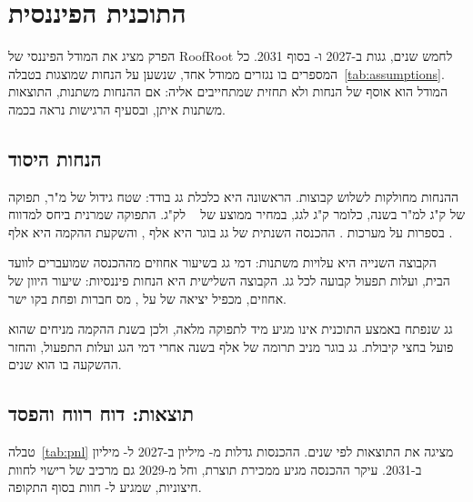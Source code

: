 \chapter{התוכנית הפיננסית}\label{ch:financials}

הפרק מציג את המודל הפיננסי של RoofRoot לחמש שנים, \RRroofsFirst{} גגות ב-2027 ו-\RRroofsFinal{} בסוף 2031. כל המספרים בו נגזרים ממודל אחד, שנשען על הנחות שמוצגות בטבלה~\ref{tab:assumptions}. המודל הוא אוסף של הנחות ולא תחזית שמתחייבים אליה: אם ההנחות משתנות, התוצאות משתנות איתן, ובסעיף הרגישות נראה בכמה.

\section{הנחות היסוד}

ההנחות מחולקות לשלוש קבוצות. הראשונה היא כלכלת גג בודד: שטח גידול של \RRarea{} מ"ר, תפוקה של \RRyield{} ק"ג למ"ר בשנה, כלומר \RRroofKg{} ק"ג לגג, במחיר ממוצע של \RRprice~\shekel{} לק"ג. התפוקה שמרנית ביחס למדווח בספרות על מערכות  \cite{barbosa2015}. ההכנסה השנתית של גג בוגר היא \RRroofRevenue{} אלף \shekel{}, והשקעת ההקמה היא \RRcapexRoof{} אלף \shekel{}.

הקבוצה השנייה היא עלויות משתנות: דמי גג בשיעור \RRrentShare{} אחוזים מההכנסה שמועברים לוועד הבית, ועלות תפעול קבועה לכל גג. הקבוצה השלישית היא הנחות פיננסיות: שיעור היוון של \RRdiscount{} אחוזים, מכפיל יציאה של \RRexitMultiple{} על , מס חברות ופחת בקו ישר.

\begin{table}[htbp]
\centering\small

\caption{הנחות היסוד של המודל. כל ערך בטבלה מוזן מקובץ הנתונים של התוכנית.}
\label{tab:assumptions}
\end{table}

גג שנפתח באמצע התוכנית אינו מגיע מיד לתפוקה מלאה, ולכן בשנת ההקמה מניחים שהוא פועל בחצי קיבולת. גג בוגר מניב תרומה של \RRroofContribution{} אלף \shekel{} בשנה אחרי דמי הגג ועלות התפעול, והחזר ההשקעה בו הוא \RRroofPayback{} שנים.

\section{תוצאות: דוח רווח והפסד}

טבלה~\ref{tab:pnl} מציגה את התוצאות לפי שנים. ההכנסות גדלות מ-\RRrevFirst{} מיליון \shekel{} ב-2027 ל-\RRrevFinal{} מיליון ב-2031. עיקר ההכנסה מגיע ממכירת תוצרת, וחל מ-2029 גם מרכיב של רישוי  לחוות חיצוניות, שמגיע ל-\RRsaasFarmsFinal{} חוות בסוף התקופה.

